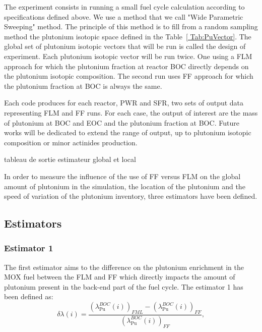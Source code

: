The experiment consists in running a small fuel cycle calculation according to
specifications defined above. We use a method that we call "Wide Parametric
Sweeping" method. The principle of this method is to fill from a random 
sampling method the plutonium isotopic space defined in the Table~\ref{
Tab:PuVector}. The global set of plutonium isotopic vectors that will be run 
is called the design of experiment. Each plutonium isotopic vector will be run 
twice. One using a \gls{FLM} approach for which the plutonium fraction at 
reactor \gls{BOC} directly depends on the plutonium isotopic composition. The 
second run uses \gls{FF} approach for which the plutonium fraction at \gls{BOC}
is always the same. 

Each code produces for each reactor, \gls{PWR} and \gls{SFR}, two sets of output data representing \gls{FLM} and \gls{FF} runs. For each case, the output of interest are the mass of plutonium at \gls{BOC} and \gls{EOC} and the plutonium fraction at \gls{BOC}. Future works will be dedicated to extend the range of output, up to plutonium isotopic composition or minor actinides production. 



tableau de sortie
estimateur global et local

In order to measure the influence of the use of \gls{FF} versus \gls{FLM} on the global amount of plutonium in the simulation, the location
of the plutonium and the speed of variation of the plutonium inventory, three
estimators have been defined.

\subsection{Estimators}
\subsubsection{Estimator 1}
The first estimator aims to the difference on the plutonium enrichment in the MOX
fuel between the \gls{FLM} and \gls{FF} which directly impacts the amount of
plutonium present in the back-end part of the fuel cycle. The estimator 1 has
been defined as:
\begin{equation}
    \delta{\lambda}(i) =
        \frac{\left(\lambda_{\mathrm{Pu}}^{BOC}(i)\right)_{FML}
              - \left(\lambda_{\mathrm{Pu}}^{BOC}(i)\right)_{FF}}
              {\left(\lambda_{\mathrm{Pu}}^{BOC}(i)\right)_{FF}},
\end{equation}

